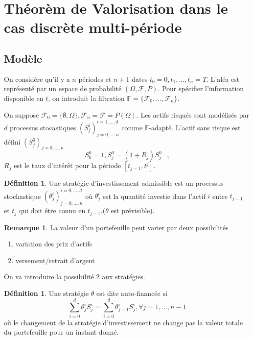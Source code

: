\documentclass{article}
\theoremstyle{plain}
\theoremstyle{definition}
\newtheorem{defn}[thm]{D\'efinition}
\newtheorem{remq}[thm]{Remarque}
\begin{document}
\section{Th\'eor\`em de Valorisation dans le cas discr\`ete multi-p\'eriode}
\subsection{Mod\`ele}
On consid\`ere qu'il y a $n$ p\'eriodes et $n+1$ dates ${t_0=0,t_1,\ldots,t_n=T}$. L'al\'ea est repr\'esent\'e par un espace de probabilit\'e $(\Omega,\mathcal{F},P)$. Pour sp\'ecifier l'information disponible en $t$, on introduit la filtration $\mathbb{F}=\{\mathcal{F}_0,\ldots,\mathcal{F}_n\}$. 

On suppose $\mathcal{F}_0=\{\emptyset,\Omega\},\mathcal{F}_n=\mathcal{F}=P(\Omega)$. Les actifs risqu\'es sont mod\'elis\'es par $d$ processus stocastiques $(S^i_j)_{j=0,\ldots,n}^{i=1,\ldots,d}$ comme $\mathbb{F}$-adapt\'e. L'actif sans risque est d\'efini $(S_j^0)_{j=0,\ldots,n}$
\begin{equation}
S_0^0=1,S_j^0=(1+R_j)S_{j-1}^0
\end{equation} 
$R_j$ est le taux d'int\'er\^et pour la p\'eriode $[t_{j-1},t^j]$.

\begin{defn}
	Une strat\'egie d'investissement admissible est un processus stochastique $(\theta_j^i)_{j=0,\ldots,n}^{i=0,\ldots,d}$ o\`u $\theta_j^i$ est la quantit\'e investie dans l'actif $i$ entre $t_{j-1}$ et $t_j$ qui doit \^etre connu en $t_{j-1}$.($\theta$ est pr\'evisible).
\end{defn}

\begin{remq}
	La valeur d'un portefeuille peut varier par deux possibilit\'es
	\begin{enumerate}
		\item variation des prix d'actifs
		\item versement/retrait d'argent
	\end{enumerate}
\end{remq}

On va introduire la possibilit\'e 2 aux strat\'egies. 

\begin{defn}
	Une strat\'egie $\theta$ est dite auto-financ\'ee si 
\begin{equation}
\sum_{i=0}^d\theta_j^i S_j^i=\sum_{i=0}^d\theta_{j-1}^i S_j^i, \forall j=1,\ldots,n-1
\end{equation}
o\`u le changement de la strat\'egie d'investissement ne change pas la valeur totale du portefeuille pour un instant donn\'e.
\end{defn}
\end{document}
